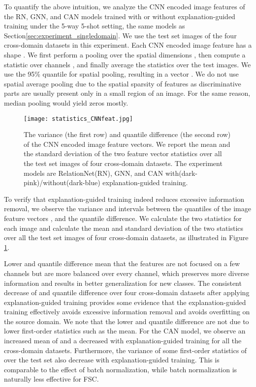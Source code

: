 \documentclass[a4paper,conference]{IEEEtran}
\begin{document}
To quantify the above intuition, we analyze the CNN encoded image features of the RN, GNN, and CAN models trained with or without explanation-guided training under the 5-way 5-shot setting, the same models as Section\ref{sec:experiment_singledomain}. We use the test set images of the four cross-domain datasets in this experiment. 
Each CNN encoded image feature has a shape . We first perform a pooling over the spatial dimensions , then compute a statistic over channels , and finally average the statistics over the test images. We use the 95\% quantile for spatial pooling, resulting in a vector . We do not use spatial average pooling due to the spatial sparsity of features as discriminative parts are usually present only in a small region of an image. For the same reason, median pooling would yield zeros mostly.
\begin{figure}
    \centering
    \texttt{[image: statistics\_CNNfeat.jpg]}
    \caption{The variance (the first row) and quantile difference (the second row) of the CNN encoded image feature vectors. We report the mean and the standard deviation of the two feature vector statistics over all the test set images of four cross-domain datasets. The experiment models are RelationNet(RN), GNN, and CAN with(dark-pink)/without(dark-blue) explanation-guided training.}
    \label{fig:statistics_variance_quantile_diff}
\end{figure}
To verify that explanation-guided training indeed reduces excessive information removal, we observe the variance and intervals between the quantiles of the image feature vectors , 
 and the  quantile difference. We calculate the two statistics for each image and calculate the mean and standard deviation of the two statistics over all the test set images of four cross-domain datasets, as illustrated in Figure \ref{fig:statistics_variance_quantile_diff}.

Lower  and quantile difference mean that the features are not focused on a few channels but are more balanced over every channel, which preserves more diverse information and results in better generalization for new classes.
The consistent decrease of  and quantile difference over four cross-domain datasets after applying explanation-guided training provides some evidence that the explanation-guided training effectively avoids excessive information removal and avoids overfitting on the source domain. We note that the lower  and quantile difference are not due to lower first-order statistics such as the mean. For the CAN model, we observe an increased mean of  and a decreased  with explanation-guided training for all the cross-domain datasets.
Furthermore, the variance of some first-order statistics of  over the test set also decrease with explanation-guided training. This is comparable to the effect of batch normalization, while batch normalization is naturally less effective for FSC.
\end{document}
